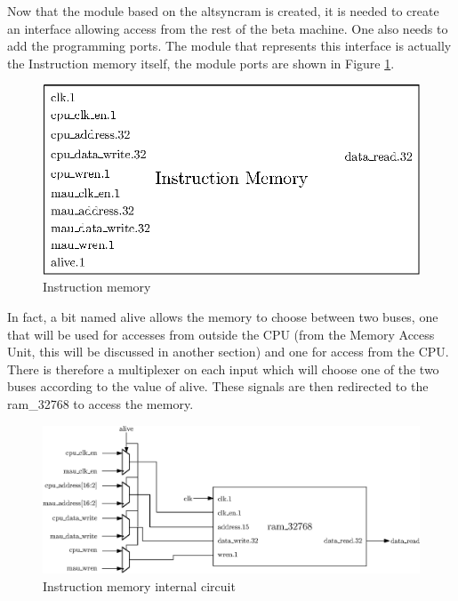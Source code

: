 Now that the module based on the altsyncram is created, it is needed to create an interface allowing 
access from the rest of the beta machine. One also needs to add the programming ports. The
module that represents this interface is actually the Instruction memory itself, the module ports
are shown in Figure \ref{fig:components/im}.

\begin{figure}[H]
    \centering
    \includegraphics[scale=0.8]{Chapter3-CPU/res/instruction_memory}
    \caption{Instruction memory}
    \label{fig:components/im}
\end{figure}

In fact, a bit named alive allows the memory to choose between two buses, one that will be used for 
accesses from outside the CPU (from the Memory Access Unit, this will be discussed in another 
section) and one for access from the CPU. There is therefore a multiplexer on each input which will 
choose one of the two buses according to the value of alive. These signals are then redirected to 
the ram\_32768 to access the memory.

\begin{figure}[H]
    \centering
    \includegraphics[width=\linewidth]{Chapter3-CPU/res/instruction_memory_in}
    \caption{Instruction memory internal circuit}
    \label{fig:components/im_in}
\end{figure}

